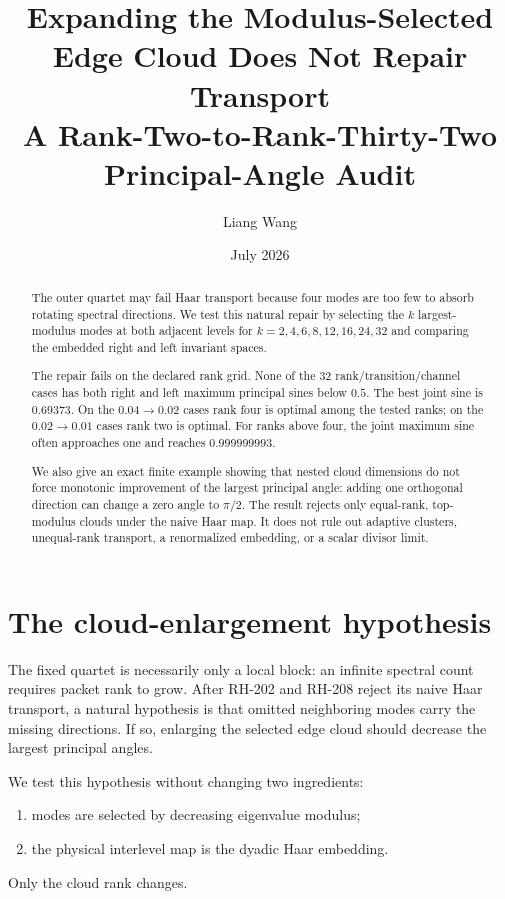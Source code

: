 \documentclass[12pt]{article}
\title{Expanding the Modulus-Selected Edge Cloud Does Not Repair Transport\\
\large A Rank-Two-to-Rank-Thirty-Two Principal-Angle Audit}
\author{Liang Wang}\date{July 2026}
\theoremstyle{remark}\newtheorem{remark}[theorem]{Remark}
\begin{document}
\maketitle
\begin{abstract}
The outer quartet may fail Haar transport because four modes are too few to
absorb rotating spectral directions.  We test this natural repair by
selecting the $k$ largest-modulus modes at both adjacent levels for
$k=2,4,6,8,12,16,24,32$ and comparing the embedded right and left invariant
spaces.

The repair fails on the declared rank grid.  None of the 32
rank/transition/channel cases has both right and left maximum principal
sines below $0.5$.  The best joint sine is $0.69373$.  On the
$0.04\to0.02$ cases rank four is optimal among the tested ranks; on the
$0.02\to0.01$ cases rank two is optimal.  For ranks above four, the joint
maximum sine often approaches one and reaches $0.999999993$.

We also give an exact finite example showing that nested cloud dimensions do
not force monotonic improvement of the largest principal angle: adding one
orthogonal direction can change a zero angle to $\pi/2$.  The result rejects
only equal-rank, top-modulus clouds under the naive Haar map.  It does not
rule out adaptive clusters, unequal-rank transport, a renormalized embedding,
or a scalar divisor limit.
\end{abstract}

\section{The cloud-enlargement hypothesis}

The fixed quartet is necessarily only a local block: an infinite spectral
count requires packet rank to grow.  After RH-202 and RH-208 reject its naive
Haar transport, a natural hypothesis is that omitted neighboring modes carry
the missing directions.  If so, enlarging the selected edge cloud should
decrease the largest principal angles.

We test this hypothesis without changing two ingredients:
\begin{enumerate}[leftmargin=2em]
\item modes are selected by decreasing eigenvalue modulus;
\item the physical interlevel map is the dyadic Haar embedding.
\end{enumerate}
Only the cloud rank changes.
\end{document}
